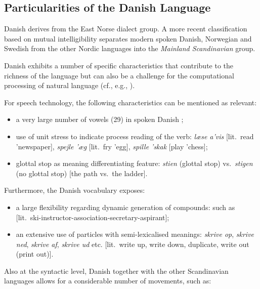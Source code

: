 \begin{multicols}{2}
\subsection{Particularities of the Danish Language}

 Danish derives from the East Norse dialect group. A more recent classification based on mutual intelligibility separates modern spoken Danish, Norwegian and Swedish from the other Nordic languages into the {\it Mainland Scandinavian} group.

Danish exhibits a number of specific characteristics that contribute to the richness of the language but can also be a challenge for the computational processing of natural language (cf., e.g., \cite{Gregersen, Hellan, Braasch}). 


For speech technology, the following characteristics can be mentioned as relevant:
\begin{itemize}
\item a very large number of vowels (29) in spoken Danish \cite{dansk}; 
\item	use of unit stress to indicate process reading of the verb: {\it l\ae se a'vis} [lit.\ read 'newspaper], {\it spejle '\ae g} [lit.\ fry 'egg],  {\it spille 'skak} [play 'chess];
\item	glottal stop as meaning differentiating feature: {\it stien} (glottal stop) vs.\ {\it stigen} (no glottal stop) [the path vs.\ the ladder].
\end{itemize}

Furthermore, the Danish vocabulary exposes:
\begin{itemize}
\item a large flexibility regarding dynamic generation of compounds: such as  [lit.\ ski-instructor-asso\-ciation-secretary-as\-pir\-ant]; 
\item	an extensive use of particles with semi-lexicalised meanings: {\it skrive op}, {\it skrive ned}, {\it skrive af}, {\it skrive ud} etc. [lit.\ write up, write down, duplicate, write out (print out)].
\end{itemize}
Also at the syntactic level, Danish together with the other Scandinavian languages allows for a considerable number of movements, such as:


\end{multicols}

